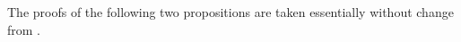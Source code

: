 \documentclass[12pt]{article}
\newtheorem{thm}{Theorem}[section]
\theoremstyle{definition}
\theoremstyle{mystyle}
\theoremstyle{remark}
\newcommand{\tp}{\mathrm{tp}}
\begin{document}

%





%

The proofs of the following two propositions are taken essentially without change from \cite{Hru12}.
\end{document}
